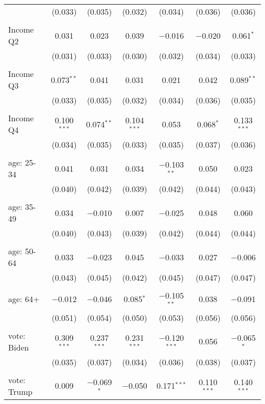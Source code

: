 \begin{tabular}{@{\extracolsep{5pt}}lcccccc}
  & (0.033) & (0.035) & (0.032) & (0.034) & (0.036) & (0.036) \\ 
  & & & & & & \\ 
 Income Q2 & 0.031 & 0.023 & 0.039 & $-$0.016 & $-$0.020 & 0.061$^{*}$ \\ 
  & (0.031) & (0.033) & (0.030) & (0.032) & (0.034) & (0.033) \\ 
  & & & & & & \\ 
 Income Q3 & 0.073$^{**}$ & 0.041 & 0.031 & 0.021 & 0.042 & 0.089$^{**}$ \\ 
  & (0.033) & (0.035) & (0.032) & (0.034) & (0.036) & (0.035) \\ 
  & & & & & & \\ 
 Income Q4 & 0.100$^{***}$ & 0.074$^{**}$ & 0.104$^{***}$ & 0.053 & 0.068$^{*}$ & 0.133$^{***}$ \\ 
  & (0.034) & (0.035) & (0.033) & (0.035) & (0.037) & (0.036) \\ 
  & & & & & & \\ 
 age: 25-34 & 0.041 & 0.031 & 0.034 & $-$0.103$^{**}$ & 0.050 & 0.023 \\ 
  & (0.040) & (0.042) & (0.039) & (0.042) & (0.044) & (0.043) \\ 
  & & & & & & \\ 
 age: 35-49 & 0.034 & $-$0.010 & 0.007 & $-$0.025 & 0.048 & 0.060 \\ 
  & (0.040) & (0.043) & (0.039) & (0.042) & (0.044) & (0.044) \\ 
  & & & & & & \\ 
 age: 50-64 & 0.033 & $-$0.023 & 0.045 & $-$0.033 & 0.027 & $-$0.006 \\ 
  & (0.043) & (0.045) & (0.042) & (0.045) & (0.047) & (0.047) \\ 
  & & & & & & \\ 
 age: 64+ & $-$0.012 & $-$0.046 & 0.085$^{*}$ & $-$0.105$^{**}$ & 0.038 & $-$0.091 \\ 
  & (0.051) & (0.054) & (0.050) & (0.053) & (0.056) & (0.056) \\ 
  & & & & & & \\ 
 vote: Biden & 0.309$^{***}$ & 0.237$^{***}$ & 0.231$^{***}$ & $-$0.120$^{***}$ & 0.056 & $-$0.065$^{*}$ \\ 
  & (0.035) & (0.037) & (0.034) & (0.036) & (0.038) & (0.037) \\ 
  & & & & & & \\ 
 vote: Trump & 0.009 & $-$0.069$^{*}$ & $-$0.050 & 0.171$^{***}$ & 0.110$^{***}$ & 0.140$^{***}$ \\ 

\end{tabular}
